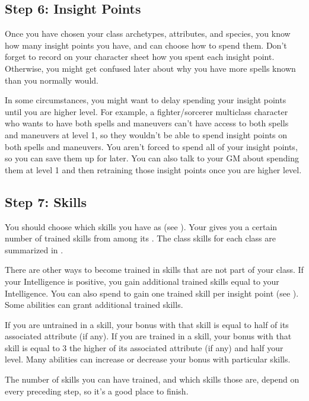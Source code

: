   \subsection{Step 6: Insight Points}
    Once you have chosen your class archetypes, attributes, and species, you know how many insight points you have, and can choose how to spend them.
    Don't forget to record on your character sheet how you spent each insight point.
    Otherwise, you might get confused later about why you have more spells known than you normally would.

    In some circumstances, you might want to delay spending your insight points until you are higher level.
    For example, a fighter/sorcerer multiclass character who wants to have both spells and maneuvers can't have access to both spells and maneuvers at level 1, so they wouldn't be able to spend insight points on both spells and maneuvers.
    You aren't forced to spend all of your insight points, so you can save them up for later.
    You can also talk to your GM about spending them at level 1 and then retraining those insight points once you are higher level.

  \subsection{Step 7: Skills}
    You should choose which skills you have as  (see ).
    Your  gives you a certain number of trained skills from among its .
    The class skills for each class are summarized in .

    There are other ways to become trained in skills that are not part of your class.
    If your Intelligence is positive, you gain additional trained skills equal to your Intelligence.
    You can also spend  to gain one trained skill per insight point (see ).
    Some abilities can grant additional trained skills.

    If you are untrained in a skill, your bonus with that skill is equal to half of its associated attribute (if any).
    If you are trained in a skill, your bonus with that skill is equal to 3 \add the higher of its associated attribute (if any) and half your level.
    Many abilities can increase or decrease your bonus with particular skills.

    The number of skills you can have trained, and which skills those are, depend on every preceding step, so it's a good place to finish.

